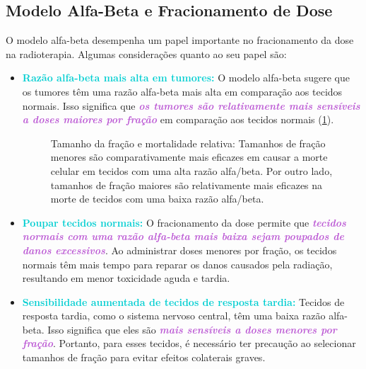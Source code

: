 \documentclass[11pt,a4paper]{article}
\begin{document}
\subsection*{Modelo Alfa-Beta e Fracionamento de Dose}

O modelo alfa-beta desempenha um papel importante no fracionamento da dose na radioterapia. Algumas considerações quanto ao seu papel são:

	\begin{itemize}
		\item \textcolor{DarkTurquoise}{\textbf{Razão alfa-beta mais alta em tumores:}} O modelo alfa-beta sugere que os tumores têm uma razão alfa-beta mais alta em comparação aos tecidos normais. Isso significa que \textcolor{MediumOrchid}{\textbf{\textit{os tumores são relativamente mais sensíveis a doses maiores por fração}}} em comparação aos tecidos normais (\ref{fig:fracionamentoEMorteCelular}).
		
		\begin{figure}[h]
			\centering
			\caption{Tamanho da fração e mortalidade relativa: Tamanhos de fração menores são comparativamente mais eficazes em causar a morte celular em tecidos com uma alta razão alfa/beta. Por outro lado, tamanhos de fração maiores são relativamente mais eficazes na morte de tecidos com uma baixa razão alfa/beta.}
			\label{fig:fracionamentoEMorteCelular}
		\end{figure}

		\item \textcolor{DarkTurquoise}{\textbf{Poupar tecidos normais:}} O fracionamento da dose permite que \textcolor{MediumOrchid}{\textbf{\textit{tecidos normais com uma razão alfa-beta mais baixa sejam poupados de danos excessivos}}}. Ao administrar doses menores por fração, os tecidos normais têm mais tempo para reparar os danos causados pela radiação, resultando em menor toxicidade aguda e tardia.

		\item \textcolor{DarkTurquoise}{\textbf{Sensibilidade aumentada de tecidos de resposta tardia:}} Tecidos de resposta tardia, como o sistema nervoso central, têm uma baixa razão alfa-beta. Isso significa que eles são \textcolor{MediumOrchid}{\textbf{\textit{mais sensíveis a doses menores por fração}}}. Portanto, para esses tecidos, é necessário ter precaução ao selecionar tamanhos de fração para evitar efeitos colaterais graves.


\end{itemize}
\end{document}
